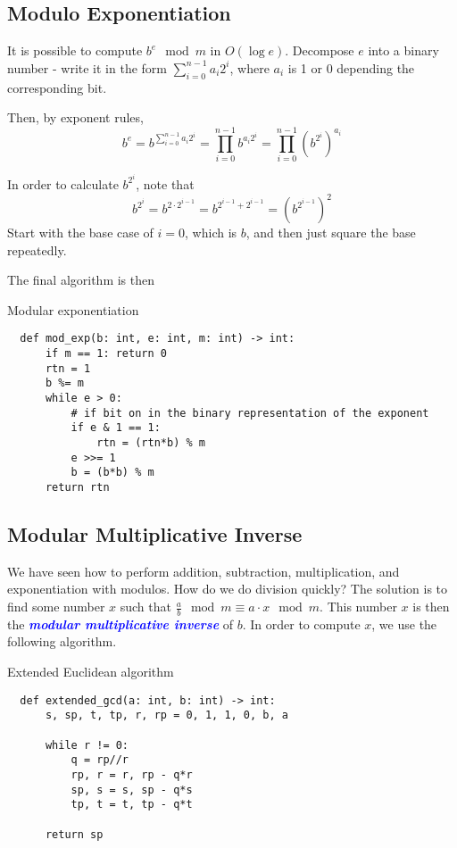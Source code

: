 \documentclass[11pt, oneside]{article}
\newcommand{\emphasis}[1]{\textcolor{blue}{\textbf{\textit{#1}}}}
\begin{document}
\subsection{Modulo Exponentiation}
It is possible to compute \( b^e \mod m \) in \( O(\log e) \). Decompose \( e \)
into a binary number - write it in the form \( \sum^{n - 1}_{i = 0} a_i 2^i \),
where \( a_i \) is 1 or 0 depending the corresponding bit.

Then, by exponent rules,
\[ b^e = b^{\sum^{n - 1}_{i = 0} a_i 2^i} = \prod^{n - 1}_{i = 0} b^{a_i 2^i} = \prod^{n - 1}_{i = 0} (b^{2^i})^{a_i} \]

In order to calculate \( b^{2^i} \), note that
\[ b^{2^i} = b^{2 \cdot 2^{i - 1}} = b^{2^{i - 1} + 2^{i - 1}} = (b^{2^{i - 1}})^2 \]
\noindent
Start with the base case of \( i = 0 \), which is \( b \), and then just square the base repeatedly.

The final algorithm is then
\begin{algorithm}
  \caption{Modular exponentiation} 
  \begin{verbatim}
  def mod_exp(b: int, e: int, m: int) -> int:
      if m == 1: return 0
      rtn = 1
      b %= m
      while e > 0:
          # if bit on in the binary representation of the exponent
          if e & 1 == 1:
              rtn = (rtn*b) % m
          e >>= 1
          b = (b*b) % m
      return rtn
  \end{verbatim}
\end{algorithm}

\subsection{Modular Multiplicative Inverse}
We have seen how to perform addition, subtraction, multiplication, and exponentiation with modulos.
How do we do division quickly?
The solution is to find some number \( x \) such that \( \frac{a}{b} \mod m \equiv a \cdot x \mod m \).
This number \( x \) is then the \emphasis{modular multiplicative inverse} of \( b \).
In order to compute \( x \), we use the following algorithm.

\begin{algorithm}
  \caption{Extended Euclidean algorithm}
  \begin{verbatim}
  def extended_gcd(a: int, b: int) -> int:
      s, sp, t, tp, r, rp = 0, 1, 1, 0, b, a

      while r != 0:
          q = rp//r
          rp, r = r, rp - q*r
          sp, s = s, sp - q*s
          tp, t = t, tp - q*t

      return sp
  \end{verbatim}
\end{algorithm}
\end{document}
